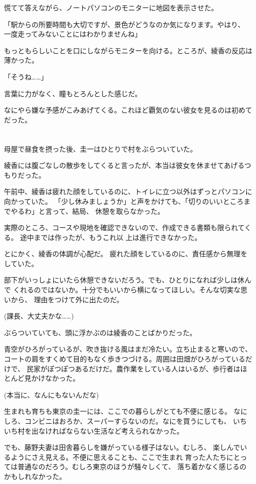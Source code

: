 ﻿\documentclass[
    book,tate,
    line_length=30zw,
    jafontsize=12pt,
    paper=b5j,
    landscape,
    ]{jlreq}
\begin{document}
慌てて答えながら、ノートパソコンのモニターに地図を表示させた。

「駅からの所要時間も大切ですが、景色がどうなのか気になります。やはり、
一度走ってみないことにはわかりませんね」

もっともらしいことを口にしながらモニターを向ける。ところが、綾香の反応は薄かった。

「そうね……」

言葉に力がなく、瞳もとろんとした感じだ。

なにやら嫌な予感がこみあげてくる。これほど覇気のない彼女を見るのは初めてだった。

\section*{}

母屋で昼食を摂った後、圭一はひとりで村をぶらついていた。

綾香には腹ごなしの散歩をしてくると言ったが、本当は彼女を休ませてあげるつもりだった。

午前中、綾香は疲れた顔をしているのに、トイレに立つ以外はずっとパソコンに向かっていた。
「少し休みましょうか」と声をかけても、「切りのいいところまでやるわ」と言って、結局、
休憩を取らなかった。

実際のところ、コースや現地を確認できないので、作成できる書類も限られてくる。
途中までは作ったが、もうこれ以 上は進行できなかった。

とにかく、綾香の体調が心配だ。 疲れた顔をしているのに、責任感から無理をしていた。

部下がいっしょにいたら休憩できないだろう。でも、ひとりになれば少しは休んで
くれるのではないか。十分でもいいから横になってほしい。そんな切実な思いから、
理由をつけて外に出たのだ。

(課長、大丈夫かな……)

ぶらついていても、頭に浮かぶのは綾香のことばかりだった。

青空がひろがっているが、吹き抜ける風はまだ冷たい。立ち止まると寒いので、
コートの肩をすくめて目的もなく歩きつづける。周囲は田畑がひろがっているだけで、
民家がぽつぽつあるだけだ。農作業をしている人はいるが、歩行者はほ とんど見かけなかった。

(本当に、なんにもないんだな)

生まれも育ちも東京の圭一には、ここでの暮らしがとても不便に感じる。
なにしろ、コンビニはおろか、スーパーすらないのだ。なにを買うにしても、
いちいち村を出なければならない生活など考えられなかった。

でも、藤野夫妻は田舎暮らしを嫌がっている様子はない。むしろ、
楽しんでいるようにさえ見える。不便に思えることも、ここで生まれ
育った人たちにとっては普通なのだろう。むしろ東京のほうが騒々しくて、
落ち着かなく感じるのかもしれなかった。
\end{document}
